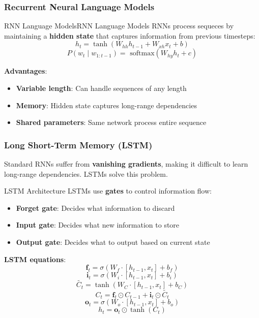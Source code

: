 \documentclass[a4paper]{article}
\theoremstyle{definition}
\begin{document}
\subsubsection{Recurrent Neural Language Models}
\begin{definition}{RNN Language Models}{RNN Language Models}
RNNs process sequeces by maintaining a \textbf{hidden state} that captures information 
from previous timesteps:
\[
  h_t = \tanh(W_{hh}h_{t-1} + W_{xh}x_t + b)
\]
\[
  P(w_t \;|\; w_{1:t - 1}) = \text{ softmax}(W_{hy}h_t + c)
\]
\end{definition}
\textbf{Advantages}:
\begin{itemize}
    \item \textbf{Variable length}: Can handle sequences of any length 
    \item \textbf{Memory}: Hidden state captures long-range dependencies 
    \item \textbf{Shared parameters}: Same network process entire sequence
\end{itemize}
\subsubsection{Long Short-Term Memory (LSTM)}
Standard RNNs suffer from \textbf{vanishing gradients}, making it difficult to learn long-range dependencies. LSTMs solve this 
problem.
\begin{theorem}{LSTM Architecture}
LSTMs use \textbf{gates} to control information flow:
\begin{itemize}
    \item \textbf{Forget gate}: Decides what information to discard 
    \item \textbf{Input gate}: Decides what new information to store 
    \item \textbf{Output gate}: Decides what to output based on current state
\end{itemize}
\textbf{LSTM equations}:
\[
  \mathbf{f}_t = \sigma(W_f \cdot [h_{t - 1}, x_t] + b_f)
\]
\[
  \mathbf{i}_t = \sigma(W_i \cdot [h_{t - 1}, x_t] + b_i)
\]
\[
  \widetilde{C_t} = \tanh(W_C \cdot [h_{t - 1}, x_t] + b_C) 
\]
\[
  C_t = \mathbf{f}_t \odot C_{t - 1} + \mathbf{i}_t \odot \widetilde{C_t} 
\]
\[
  \mathbf{o}_t = \sigma(W_o \cdot [h_{t - 1},x_t] + b_o)
\]
\[
  h_t = \mathbf{o}_t \odot \tanh(C_t)
\]
\end{theorem}
\end{document}
